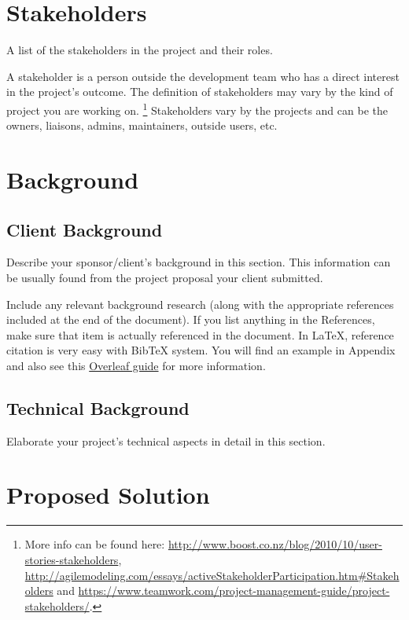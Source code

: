 \documentclass{article}
\begin{document}
\section{Stakeholders}
A list of the stakeholders in the project and their roles.

A stakeholder is a person outside the development team who has a direct interest in the project's outcome. The definition of stakeholders may vary by the kind of project you are working on.  \footnote{More info can be found here: \url{http://www.boost.co.nz/blog/2010/10/user-stories-stakeholders}, \url{http://agilemodeling.com/essays/activeStakeholderParticipation.htm\#Stakeholders} and \url{https://www.teamwork.com/project-management-guide/project-stakeholders/}.}
Stakeholders vary by the projects and can be the owners, liaisons, admins, maintainers, outside users, etc.

\section{Background}

\subsection{Client Background}
Describe your sponsor/client's background in this section. This information can be usually found from the project proposal your client submitted.

Include any relevant background research (along with the appropriate references included at the end of the document). If you list anything in the References, make sure that item is actually referenced in the document. In LaTeX, reference citation is very easy with BibTeX system. You will find an example in Appendix and also see this \href{https://www.overleaf.com/learn/latex/bibliography_management_with_bibtex}{Overleaf guide} for more information.

\subsection{Technical Background}
Elaborate your project's technical aspects in detail in this section. 

\section{Proposed Solution}
\end{document}
